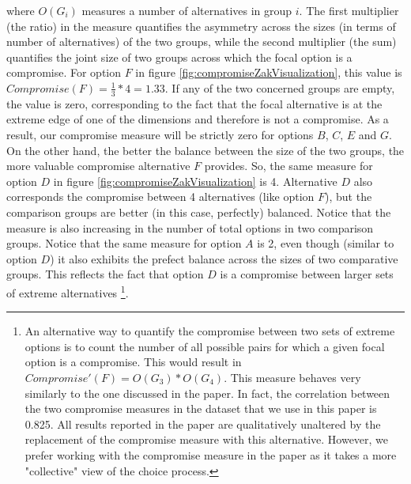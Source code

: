 \documentclass[a4paper,12pt]{article}
\begin{document}
where $O(G_i)$ measures a number of alternatives in group $i$. The first multiplier (the ratio) in the measure quantifies the asymmetry across the sizes (in terms of number of alternatives) of the two groups, while the second multiplier (the sum) quantifies the joint size of two groups across which the focal option is a compromise. For option $F$ in figure \ref{fig:compromiseZakVisualization}, this value is $Compromise(F) = \frac{1}{3} * 4 = 1.33$. If any of the two concerned groups are empty, the value is zero, corresponding to the fact that the focal alternative is at the extreme edge of one of the dimensions and therefore is not a compromise. As a result, our compromise measure will be strictly zero for options $B$, $C$, $E$ and $G$. On the other hand, the better the balance between the size of the two groups, the more valuable compromise alternative $F$ provides. So, the same measure for option $D$ in figure \ref{fig:compromiseZakVisualization} is 4. Alternative $D$ also corresponds the compromise between 4 alternatives (like option $F$), but the comparison groups are better (in this case, perfectly) balanced. Notice that the measure is also increasing in the number of total options in two comparison groups. Notice that the same measure for option $A$ is 2, even though (similar to option $D$) it also exhibits the prefect balance across the sizes of two comparative groups. This reflects the fact that option $D$ is a compromise between larger sets of extreme alternatives \footnote{An alternative way to quantify the compromise between two sets of extreme options is to count the number of all possible pairs for which a given focal option is a compromise. This would result in $Compromise'(F) = O(G_3) * O(G_4)$. This measure behaves very similarly to the one discussed in the paper. In fact, the correlation between the two compromise measures in the dataset that we use in this paper is 0.825. All results reported in the paper are qualitatively unaltered by the replacement of the compromise measure with this alternative. However, we prefer working with the compromise measure in the paper as it takes a more "collective" view of the choice process.}. 
\end{document}

